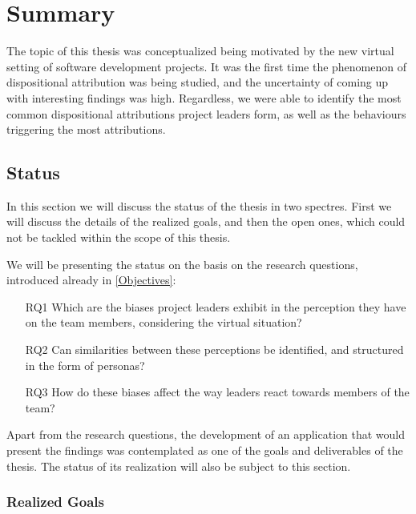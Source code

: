 \chapter{Summary}


The topic of this thesis was conceptualized being motivated by the new virtual setting of software development projects.  It was the first time the phenomenon of dispositional attribution was being studied, and the uncertainty of coming up with interesting findings was high.  Regardless, we were able to identify the most common dispositional attributions project leaders form, as well as the behaviours triggering the most attributions.  

\section{Status}


In this section we will discuss the status of the thesis in two spectres. First we will discuss the details of the realized goals, and then the open ones, which could not be tackled within the scope of this thesis. 

We will be presenting the status on the basis on the research questions, introduced already in \ref{Objectives}: 
\begin{itemize}
	\item [RQ1] Which are the biases project leaders exhibit in the perception they have on the team members, considering the virtual situation?
	\item [RQ2] Can similarities between these perceptions be identified, and structured in the form of personas?
	\item [RQ3] How do these biases affect the way leaders react towards members of the team?
\end{itemize}

Apart from the research questions,  the development of an application that would present the findings was contemplated as one of the goals and deliverables of the thesis.  The status of its realization will also be subject to this section.

\subsection{Realized Goals}

